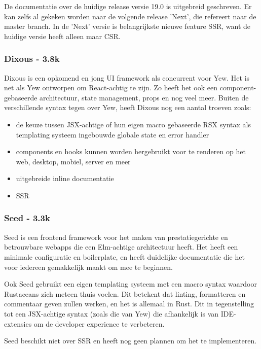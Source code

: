 De documentatie over de huidige release versie 19.0 is uitgebreid geschreven.  Er kan zelfs al
gekeken worden naar de volgende release 'Next', die refereert naar de master branch. In de 'Next'
versie is belangrijkste nieuwe feature SSR, want de huidige versie heeft alleen maar CSR.

\subsubsection{Dixous - 3.8k}

Dixous is een opkomend en jong UI framework als concurrent voor Yew. Het is net als Yew ontworpen om
React-achtig te zijn. Zo heeft het ook een component-gebaseerde architectuur, state management,
props en nog veel meer. Buiten de verschillende syntax tegen over Yew, heeft Dixous nog een aantal
troeven zoals:  
\begin{itemize}
  \item de keuze tussen JSX-achtige of hun eigen macro gebaseerde RSX syntax als templating systeem
    ingebouwde globale state en error handler 

  \item components en hooks kunnen worden hergebruikt voor te renderen op het web, desktop, mobiel,
    server en meer 

  \item uitgebreide inline documentatie 

  \item SSR 
\end{itemize}

\subsubsection{Seed - 3.3k}

Seed is een frontend framework voor het maken van prestatiegerichte en betrouwbare webapps die een
Elm-achtige architectuur heeft. Het heeft een minimale configuratie en boilerplate, en heeft
duidelijke documentatie die het voor iedereen gemakkelijk maakt om mee te beginnen.  

Ook Seed gebruikt een eigen templating systeem met een macro syntax waardoor Rustaceans zich meteen
thuis voelen. Dit betekent dat linting, formatteren en commentaar geven zullen werken, en het is
allemaal in Rust. Dit in tegenstelling tot een JSX-achtige syntax (zoals die van Yew) die
afhankelijk is van IDE-extensies om de developer experience te verbeteren. 

Seed beschikt niet over SSR en heeft nog geen plannen om het te implementeren. 

